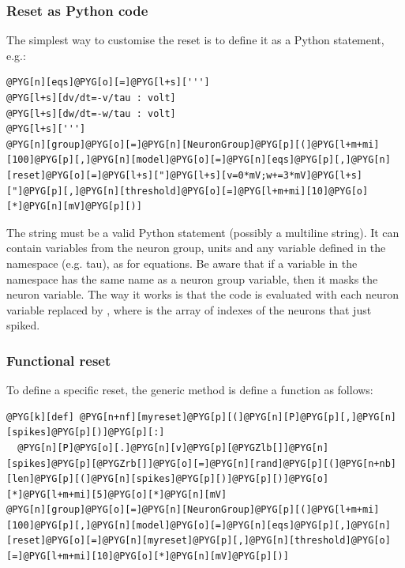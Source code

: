 \documentclass[letterpaper,10pt,english]{manual}
\begin{document}
\subsubsection{Reset as Python code}

The simplest way to customise the reset is to define it as a Python statement, e.g.:

\begin{Verbatim}[commandchars=@\[\]]
@PYG[n][eqs]@PYG[o][=]@PYG[l+s][''']
@PYG[l+s][dv/dt=-v/tau : volt]
@PYG[l+s][dw/dt=-w/tau : volt]
@PYG[l+s][''']
@PYG[n][group]@PYG[o][=]@PYG[n][NeuronGroup]@PYG[p][(]@PYG[l+m+mi][100]@PYG[p][,]@PYG[n][model]@PYG[o][=]@PYG[n][eqs]@PYG[p][,]@PYG[n][reset]@PYG[o][=]@PYG[l+s]["]@PYG[l+s][v=0*mV;w+=3*mV]@PYG[l+s]["]@PYG[p][,]@PYG[n][threshold]@PYG[o][=]@PYG[l+m+mi][10]@PYG[o][*]@PYG[n][mV]@PYG[p][)]
\end{Verbatim}

The string must be a valid Python statement (possibly a multiline string). It can
contain variables from the neuron group, units and any variable defined in the namespace
(e.g. tau), as for equations. Be aware that if a variable in the namespace has the same
name as a neuron group variable, then it masks the neuron variable. The way it works is
that the code is evaluated with each neuron variable  replaced by , where
 is the array of indexes of the neurons that just spiked.


\subsubsection{Functional reset}

To define a specific reset, the generic method is define a function as follows:

\begin{Verbatim}[commandchars=@\[\]]
@PYG[k][def] @PYG[n+nf][myreset]@PYG[p][(]@PYG[n][P]@PYG[p][,]@PYG[n][spikes]@PYG[p][)]@PYG[p][:]
  @PYG[n][P]@PYG[o][.]@PYG[n][v]@PYG[p][@PYGZlb[]]@PYG[n][spikes]@PYG[p][@PYGZrb[]]@PYG[o][=]@PYG[n][rand]@PYG[p][(]@PYG[n+nb][len]@PYG[p][(]@PYG[n][spikes]@PYG[p][)]@PYG[p][)]@PYG[o][*]@PYG[l+m+mi][5]@PYG[o][*]@PYG[n][mV]
@PYG[n][group]@PYG[o][=]@PYG[n][NeuronGroup]@PYG[p][(]@PYG[l+m+mi][100]@PYG[p][,]@PYG[n][model]@PYG[o][=]@PYG[n][eqs]@PYG[p][,]@PYG[n][reset]@PYG[o][=]@PYG[n][myreset]@PYG[p][,]@PYG[n][threshold]@PYG[o][=]@PYG[l+m+mi][10]@PYG[o][*]@PYG[n][mV]@PYG[p][)]
\end{Verbatim}
\end{document}
